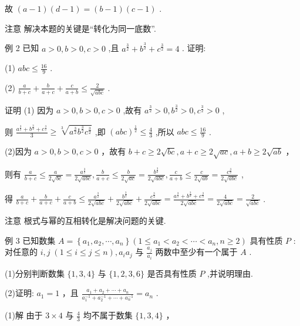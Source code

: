 \documentclass[10pt]{article}
\begin{document}
故 \(\left( {a - 1}\right) \left( {d - 1}\right)  = \left( {b - 1}\right) \left( {c - 1}\right)\) .

注意 解决本题的关键是“转化为同一底数”.

例 2 已知 \(a > 0,b > 0,c > 0\) ,且 \({a}^{\frac{3}{2}} + {b}^{\frac{3}{2}} + {c}^{\frac{3}{2}} = 4\) . 证明:

(1) \({abc} \leq  \frac{16}{9}\) .

(2) \(\frac{a}{b + c} + \frac{b}{a + c} + \frac{c}{a + b} \leq  \frac{2}{\sqrt{abc}}\) .

证明 (1) 因为 \(a > 0,b > 0,c > 0\) ,故有 \({a}^{\frac{3}{2}} > 0,{b}^{\frac{3}{2}} > 0,{c}^{\frac{3}{2}} > 0\) ,

则 \(\frac{{a}^{\frac{3}{2}} + {b}^{\frac{3}{2}} + {c}^{\frac{3}{2}}}{3} \geq  \sqrt[3]{{a}^{\frac{3}{2}}{b}^{\frac{3}{2}}{c}^{\frac{3}{2}}}\) ,即 \({\left( abc\right) }^{\frac{1}{2}} \leq  \frac{4}{3}\) ,所以 \({abc} \leq  \frac{16}{9}\) .

(2)因为 \(a > 0,b > 0,c > 0\) ，故有 \(b + c \geq  2\sqrt{bc},a + c \geq  2\sqrt{ac},a + b \geq  2\sqrt{ab}\) ，

则有 \(\frac{a}{b + c} \leq  \frac{a}{2\sqrt{bc}} = \frac{{a}^{\frac{3}{2}}}{2\sqrt{abc}},\frac{b}{a + c} \leq  \frac{b}{2\sqrt{ac}} = \frac{{b}^{\frac{3}{2}}}{2\sqrt{abc}},\frac{c}{a + b} \leq  \frac{c}{2\sqrt{ab}} = \frac{{c}^{\frac{3}{2}}}{2\sqrt{abc}}\) ,

得 \(\frac{a}{b + c} + \frac{b}{a + c} + \frac{c}{a + b} \leq  \frac{{a}^{\frac{3}{2}}}{2\sqrt{abc}} + \frac{{b}^{\frac{3}{2}}}{2\sqrt{abc}} + \frac{{c}^{\frac{3}{2}}}{2\sqrt{abc}} = \frac{{a}^{\frac{3}{2}} + {b}^{\frac{3}{2}} + {c}^{\frac{3}{2}}}{2\sqrt{abc}} = \frac{4}{2\sqrt{abc}} = \frac{2}{\sqrt{abc}}\) .

注意 根式与幂的互相转化是解决问题的关键.

例 3 已知数集 \(A = \left\{  {{a}_{1},{a}_{2},\cdots ,{a}_{n}}\right\}  \left( {1 \leq  {a}_{1} < {a}_{2} < \cdots  < {a}_{n},n \geq  2}\right)\) 具有性质 \(P\) : 对任意的 \(i,j \; \left( {1 \leq  i \leq  j \leq  n}\right) ,{a}_{i}{a}_{j}\) 与 \(\frac{{a}_{j}}{{a}_{i}}\) 两数中至少有一个属于 \(A\) .

(1)分别判断数集 \(\{ 1,3,4\}\) 与 \(\{ 1,2,3,6\}\) 是否具有性质 \(P\) ,并说明理由.

(2)证明: \({a}_{1} = 1\) ，且 \(\frac{{a}_{1} + {a}_{2} + \cdots  + {a}_{n}}{{a}_{1}^{-1} + {a}_{2}^{-1} + \cdots  + {a}_{n}^{-1}} = {a}_{n}\) .

(1)解 由于 \(3 \times  4\) 与 \(\frac{4}{3}\) 均不属于数集 \(\{ 1,3,4\}\) ，
\end{document}
